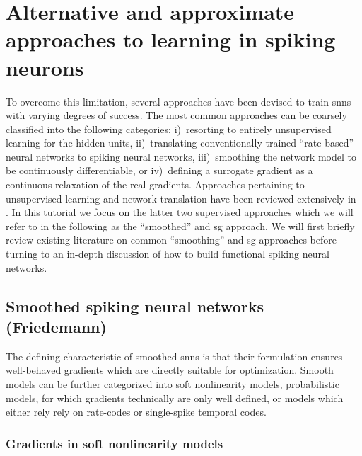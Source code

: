 \documentclass[journal,onecolumn,11pt]{IEEEtran}
\begin{document}
\section{Alternative and approximate approaches to learning in spiking neurons}
To overcome this limitation, several approaches have been devised to train \glspl{snn} with varying degrees of success.
The most common approaches can be coarsely classified into the following categories: 
  i)~resorting to entirely unsupervised learning for the hidden units, 
 ii)~translating conventionally trained ``rate-based'' neural networks to spiking neural networks,
iii)~smoothing the network model to be continuously differentiable, or 
 iv)~defining a surrogate gradient as a continuous relaxation of the real
gradients.  
Approaches pertaining to unsupervised learning and network translation have been reviewed extensively in \cite{tavanaei_deep_2018}. 
In this tutorial we focus on the latter two supervised approaches which we will refer to in the following as the ``smoothed'' and \gls{sg} approach.
We will first briefly review existing literature on common ``smoothing'' and \gls{sg} approaches before turning to an in-depth discussion of how to build functional spiking neural networks. 


\subsection{Smoothed spiking neural networks (Friedemann)}

The defining characteristic of smoothed \glspl{snn} is that their formulation ensures well-behaved gradients which are directly suitable for optimization.
Smooth models can be further categorized into soft nonlinearity models, probabilistic models, for which gradients technically are only well defined, or models which either rely rely on rate-codes or
single-spike temporal codes.  


\subsubsection{Gradients in soft nonlinearity models}
\end{document}
